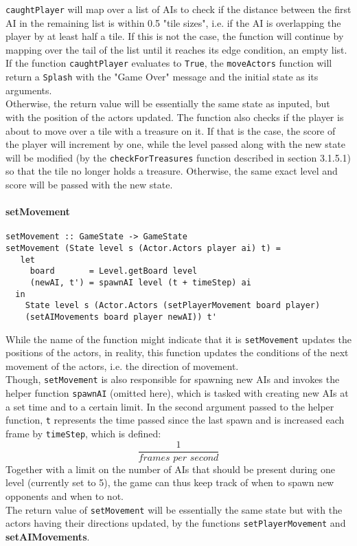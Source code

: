 \documentclass{article}
\begin{document}
		\noindent\texttt{caughtPlayer} will map over a list of AIs to check if the distance between the first AI in the remaining list is within 0.5 "tile sizes", i.e. if the AI is overlapping the player by at least half a tile. If this is not the case, the function will continue by mapping over the tail of the list until it reaches its edge condition, an empty list. \\
        \newline
        If the function \texttt{caughtPlayer} evaluates to \texttt{True}, the \texttt{moveActors} function will return a \texttt{Splash} with the "Game Over" message and the initial state as its arguments. \\
        \newline
        Otherwise, the return value will be essentially the same state as inputed, but with the position of the actors updated. The function also checks if the player is about to move over a tile with a treasure on it. If that is the case, the score of the player will increment by one, while the level passed along with the new state will be modified (by the \texttt{checkForTreasures} function described in section 3.1.5.1) so that the tile no longer holds a treasure. Otherwise, the same exact level and score will be passed with the new state.
			\paragraph{setMovement}
            \begin{verbatim}
setMovement :: GameState -> GameState
setMovement (State level s (Actor.Actors player ai) t) =
   let
     board       = Level.getBoard level
     (newAI, t') = spawnAI level (t + timeStep) ai
  in
    State level s (Actor.Actors (setPlayerMovement board player)
    (setAIMovements board player newAI)) t'
            \end{verbatim}
            While the name of the function might indicate that it is \texttt{setMovement} updates the positions of the actors, in reality, this function updates the conditions of the next movement of the actors, i.e. the direction of movement. \\
            \newline
			Though, \texttt{setMovement} is also responsible for spawning new AIs and invokes the helper function \texttt{spawnAI} (omitted here), which is tasked with creating new AIs at a set time and to a certain limit. In the second argument passed to the helper function, \texttt{t} represents the time passed since the last spawn and is increased each frame by \texttt{timeStep}, which is defined: \[\frac{1}{\textit{frames per second}}\]
            Together with a limit on the number of AIs that should be present during one level (currently set to 5), the game can thus keep track of when to spawn new opponents and when to not.
			\\
            \newline
            The return value of \texttt{setMovement} will be essentially the same state but with the actors having their directions updated, by the functions \texttt{setPlayerMovement} and \textbf{setAIMovements}.
\end{document}
